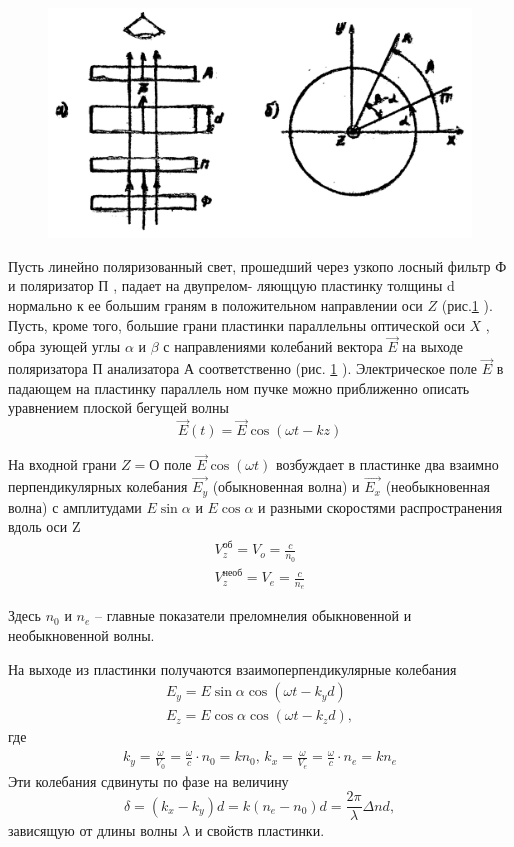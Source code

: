 \begin{figure}[H]
	\centering
	\includegraphics[width=\textwidth]{pic/3f.jpg}
	\caption{}
	\label{fig:figure5}
\end{figure}

Пусть линейно поляризованный свет, прошедший через узкопо­
лосный фильтр $\text{Ф}$ и поляризатор $\text{П}$ , падает на двупрелом-
ляющцую пластинку толщины d нормально к ее большим граням в
положительном направлении оси $Z$ (рис.\ref{fig:figure5} ). Пусть, кроме того,
большие грани пластинки параллельны оптической оси $X$ , обра­
зующей углы $\alpha$ и $\beta$ с направлениями колебаний вектора $\vec{E}$
на выходе поляризатора П анализатора А соответственно
(рис. \ref{fig:figure5} ). Электрическое поле $\vec{E}$ в падающем на пластинку параллель­
ном пучке можно приближенно описать уравнением плоской бегущей
волны 
\begin{equation}
	\vec{E}(t)=\vec{E}\cos(\omega t-kz)
\end{equation}



На входной грани $Z=О$ поле $\vec{E}\cos(\omega t)$ возбуждает
в пластинке два взаимно перпендикулярных колебания $\vec{E_y}$
(обыкновенная волна) и $\vec{E_x}$ (необыкновенная волна) с амплитудами $E\sin\alpha$ и $E\cos\alpha$ и разными скоростями
распространения вдоль оси Z
\begin{gather}
	V_z^{\text{об}}=V_o=\frac{c}{n_0} \\
	V_z^{\text{необ}}=V_e=\frac{c}{n_e}
\end{gather}

Здесь $n_0$ и $n_e$ -- главные показатели преломнелия обыкновенной и необыкновенной волны.

На выходе из пластинки получаются взаимоперпендикулярные колебания
\begin{gather}
	E_y=E\sin\alpha\cos(\omega t -k_yd) \\
	E_z=E\cos\alpha\cos(\omega t -k_zd),
\end{gather}
где
\begin{gather}
	k_y=\frac{\omega}{V_0}=\frac{\omega}{c}\cdot n_0=kn_0, \,
	k_x=\frac{\omega}{V_e}=\frac{\omega}{c}\cdot n_e=kn_e
\end{gather}
Эти колебания сдвинуты по фазе на величину
\begin{equation}
	\label{eq:3.1}
	\delta=(k_x-k_y)d=k(n_e-n_0)d=\frac{2\pi}{\lambda}\Delta nd,
\end{equation}
зависящую от длины волны $\lambda$ и свойств пластинки.

